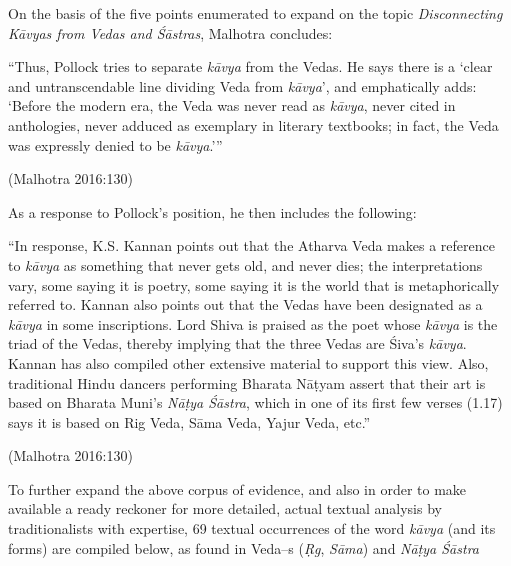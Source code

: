 On the basis of the five points enumerated to expand on the topic \textit{Disconnecting Kāvyas from Vedas and Śāstras}, Malhotra concludes:

\begin{myquote}
 “Thus, Pollock tries to separate \textit{kāvya} from the Vedas. He says there is a ‘clear and untranscendable line dividing Veda from \textit{kāvya}’, and emphatically adds: ‘Before the modern era, the Veda was never read as \textit{kāvya}, never cited in anthologies, never adduced as exemplary in literary textbooks; in fact, the Veda was expressly denied to be \textit{kāvya}.’”
\end{myquote}

\hfill (Malhotra 2016:130)

As a response to Pollock’s position, he then includes the following:

\begin{myquote}
“In response, K.S. Kannan points out that the Atharva Veda makes a reference to \textit{kāvya} as something that never gets old, and never dies; the interpretations vary, some saying it is poetry, some saying it is the world that is metaphorically referred to. Kannan also points out that the Vedas have been designated as a \textit{kāvya} in some inscriptions. Lord Shiva is praised as the poet whose \textit{kāvya} is the triad of the Vedas, thereby implying that the three Vedas are Śiva’s \textit{kāvya}. Kannan has also compiled other extensive material to support this view. Also, traditional Hindu dancers performing Bharata Nāṭyam assert that their art is based on Bharata Muni’s \textit{Nāṭya Śāstra}, which in one of its first few verses (1.17) says it is based on Rig Veda, Sāma Veda, Yajur Veda, etc.”
\end{myquote}

\hfill (Malhotra 2016:130)

To further expand the above corpus of evidence, and also in order to make available a ready reckoner for more detailed, actual textual analysis by traditionalists with expertise, 69 textual occurrences of the word \textit{kāvya} (and its forms) are compiled below, as found in Veda–s (\textit{Ṛg}, \textit{Sāma}) and \textit{Nāṭya Śāstra}

